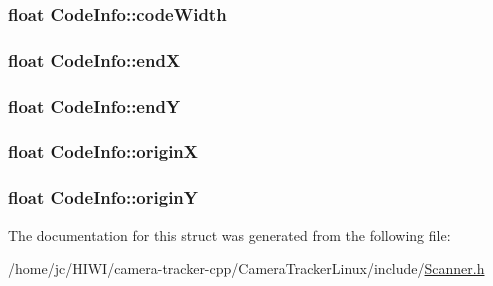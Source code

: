 \subsubsection[{\texorpdfstring{code\+Width}{codeWidth}}]{\setlength{\rightskip}{0pt plus 5cm}float Code\+Info\+::code\+Width}\hypertarget{struct_code_info_ab8493ec1c1f670d1060bde6c261f9e80}{}\label{struct_code_info_ab8493ec1c1f670d1060bde6c261f9e80}
\subsubsection[{\texorpdfstring{endX}{endX}}]{\setlength{\rightskip}{0pt plus 5cm}float Code\+Info\+::endX}\hypertarget{struct_code_info_afcbf3d398415769aba6f875c29395ec7}{}\label{struct_code_info_afcbf3d398415769aba6f875c29395ec7}
\subsubsection[{\texorpdfstring{endY}{endY}}]{\setlength{\rightskip}{0pt plus 5cm}float Code\+Info\+::endY}\hypertarget{struct_code_info_a8d3d91e8e32d9294b514950029755841}{}\label{struct_code_info_a8d3d91e8e32d9294b514950029755841}
\subsubsection[{\texorpdfstring{originX}{originX}}]{\setlength{\rightskip}{0pt plus 5cm}float Code\+Info\+::originX}\hypertarget{struct_code_info_aaf7a04108a44c795809b1c0322f53a9b}{}\label{struct_code_info_aaf7a04108a44c795809b1c0322f53a9b}
\subsubsection[{\texorpdfstring{originY}{originY}}]{\setlength{\rightskip}{0pt plus 5cm}float Code\+Info\+::originY}\hypertarget{struct_code_info_aa4dab88d16276786b4556f021fd192f7}{}\label{struct_code_info_aa4dab88d16276786b4556f021fd192f7}


The documentation for this struct was generated from the following file\+:\begin{DoxyCompactItemize}
\item 
/home/jc/\+H\+I\+W\+I/camera-\/tracker-\/cpp/\+Camera\+Tracker\+Linux/include/\hyperlink{_scanner_8h}{Scanner.\+h}\end{DoxyCompactItemize}
